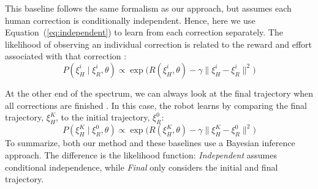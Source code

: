 \smallskip
{}
This baseline follows the same formalism as our approach, but assumes each human correction is conditionally independent. Hence, here we use Equation~(\ref{eq:independent}) to learn from each correction separately. The likelihood of observing an individual correction is related to the reward and effort associated with that correction \cite{bajcsy2017learning}:
\begin{equation}
    \label{eq:ind}
    P(\xi_H^i \mid \xi_R^{i}, \theta) \propto \exp\big(R(\xi_H^i, \theta) - \gamma\|\xi_H^i - \xi_R^i\|^2\big)
\end{equation}

\smallskip
{}
At the other end of the spectrum, we can always look at the final trajectory when all corrections are finished \cite{jain2015learning}. In this case, the robot learns by comparing the final trajectory, $\xi_H^K$, to the initial trajectory, $\xi_R^0$:
\begin{equation} \label{eq:final}
    P(\xi_H^K \mid \xi_R^0, \theta) \propto \exp\big(R(\xi_H^K, \theta) - \gamma\|\xi_H^K - \xi_R^0\|^2\big)
\end{equation}
To summarize, both our method and these baselines use a Bayesian inference approach. The difference is the likelihood function: \textit{Independent} assumes conditional independence, while \textit{Final} only considers the initial and final trajectory.